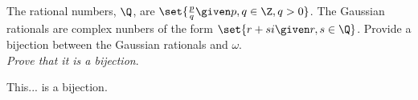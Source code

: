 \begin{problem}
  The rational numbers, $\Q$, are
  $\set{\frac{p}{q} \given p, q \in \Z, q > 0}$.
  The Gaussian rationals are complex nunbers of the form
  $\set{ r + si \given r, s \in \Q}$.
  Provide a bijection between the Gaussian rationals
  and $\omega$. \\
  \emph{Prove that it is a bijection}.

  \begin{answer}
    This... is a bijection.
  \end{answer}
\end{problem}
